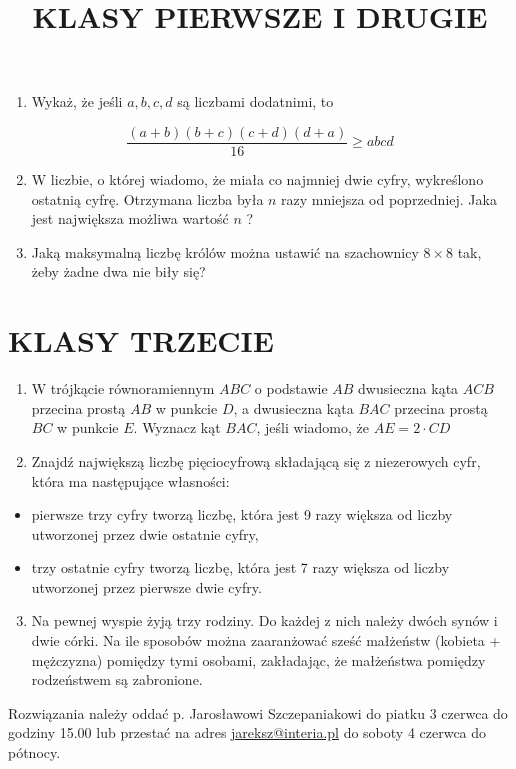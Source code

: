 \documentclass[10pt]{article}
\title{KLASY PIERWSZE I DRUGIE }
\author{}
\date{}
\begin{document}
\maketitle
\begin{enumerate}
  \item Wykaż, że jeśli \(a, b, c, d\) są liczbami dodatnimi, to
\end{enumerate}

\[
\frac{(a+b)(b+c)(c+d)(d+a)}{16} \geq a b c d
\]

\begin{enumerate}
  \setcounter{enumi}{1}
  \item W liczbie, o której wiadomo, że miała co najmniej dwie cyfry, wykreślono ostatnią cyfrę. Otrzymana liczba była \(n\) razy mniejsza od poprzedniej. Jaka jest największa możliwa wartość \(n\) ?
  \item Jaką maksymalną liczbę królów można ustawić na szachownicy \(8 \times 8\) tak, żeby żadne dwa nie biły się?
\end{enumerate}

\section*{KLASY TRZECIE}
\begin{enumerate}
  \item W trójkącie równoramiennym \(A B C\) o podstawie \(A B\) dwusieczna kąta \(A C B\) przecina prostą \(A B\) w punkcie \(D\), a dwusieczna kąta \(B A C\) przecina prostą \(B C\) w punkcie \(E\). Wyznacz kąt \(B A C\), jeśli wiadomo, że \(A E=2 \cdot C D\)
  \item Znajdź największą liczbę pięciocyfrową składającą się z niezerowych cyfr, która ma następujące własności:
\end{enumerate}

\begin{itemize}
  \item pierwsze trzy cyfry tworzą liczbę, która jest 9 razy większa od liczby utworzonej przez dwie ostatnie cyfry,
  \item trzy ostatnie cyfry tworzą liczbę, która jest 7 razy większa od liczby utworzonej przez pierwsze dwie cyfry.
\end{itemize}

\begin{enumerate}
  \setcounter{enumi}{2}
  \item Na pewnej wyspie żyją trzy rodziny. Do każdej z nich należy dwóch synów i dwie córki. Na ile sposobów można zaaranżować sześć małżeństw (kobieta + mężczyzna) pomiędzy tymi osobami, zakładając, że małżeństwa pomiędzy rodzeństwem są zabronione.
\end{enumerate}

Rozwiązania należy oddać p. Jarosławowi Szczepaniakowi do piatku 3 czerwca do godziny 15.00 lub przestać na adres \href{mailto:jareksz@interia.pl}{jareksz@interia.pl} do soboty 4 czerwca do pótnocy.
\end{document}
